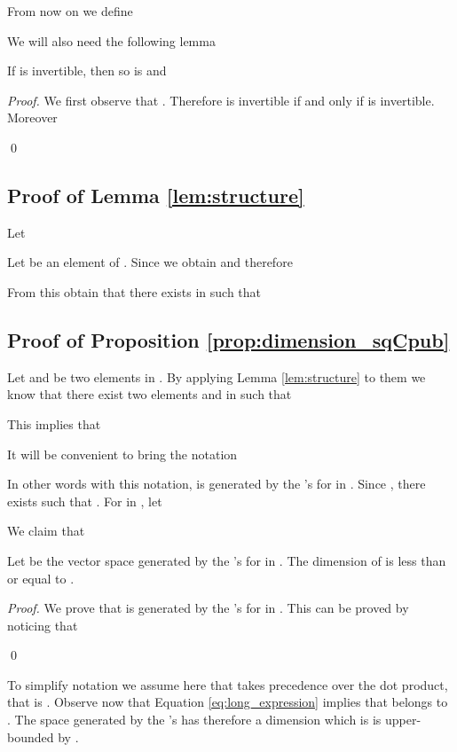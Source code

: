 \documentclass[runningheads,11pt]{llncs}
\begin{document}
 From now on we define
 
 
We will also need the following lemma
\begin{lemma}
\label{lem:inverse}
If  is invertible, then so is  and

\end{lemma}
\begin{proof}
We first observe that 
. Therefore
 is invertible if and only if  is invertible.
Moreover

\qed
\end{proof}
 \subsection{Proof of Lemma \ref{lem:structure}}
 
 Let 
 
 Let  be an element of .
 Since  we obtain
  and therefore
 
 From this obtain that there exists  in  such that
 
 
 \subsection{Proof of Proposition \ref{prop:dimension_sqCpub}}
 
 Let  and  be two elements in . By applying Lemma \ref{lem:structure} to them we know that there exist two elements
  and  in  such that
 
 This implies that
 
 
 It will be convenient to bring the notation
 
 In other words with this notation,  is generated by the
 's for  in . 
 Since , there exists  such that
 .
 For  in , let 
 
 
We claim that 
\begin{lemma}\label{lem:dimension}
Let  be the vector space generated by the 's for  in .
The dimension of  is less than or equal to .
\end{lemma}
 \begin{proof}
 We prove that  is generated by the 's for  in .
 This can be proved by noticing that 
 
 \qed
 \end{proof}
 To simplify notation we assume here that  takes precedence over the dot product, that is 
 .
 Observe now that Equation \eqref{eq:long_expression} implies that 
  belongs to .
 The space generated by the 's has therefore a dimension which is is upper-bounded by
 .
 
 
 
\end{document}
